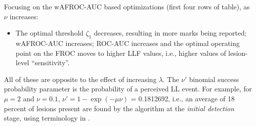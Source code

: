 \documentclass[
]{book}
\providecommand{\tightlist}{%
  \setlength{\itemsep}{0pt}\setlength{\parskip}{0pt}}
\begin{document}
\begin{table}[H]

\caption{\label{tab:optim-op-point-table2}Summary of optimization results for $\mu = 2$, $\lambda = 5$ and different values of $\nu$. The wAFROC column always displays wAFROC-AUC, even though the optimized quantity may the Youden-index, as in the last four rows.}
\centering
{}
\end{table}

Focusing on the wAFROC-AUC based optimizations (first four rows of table), as \(\nu\) increases:

\begin{itemize}
\tightlist
\item
  The optimal threshold \(\zeta_1\) decreases, resulting in more marks being reported; wAFROC-AUC increases; ROC-AUC increases and the optimal operating point on the FROC moves to higher LLF values, i.e., higher values of lesion-level ``sensitivity''.
\end{itemize}

All of these are opposite to the effect of increasing \(\lambda\). The \(\nu'\) binomial success probability parameter is the probability of a perceived LL event. For example, for \(\mu = 2\) and \(\nu = 0.1\), \(\nu' = 1 - \exp(-\mu \nu)\) = 0.1812692, i.e., an average of 18 percent of lesions present are found by the algorithm at the \emph{initial detection} stage, using terminology in \citep{edwards2002maximum}.
\end{document}
